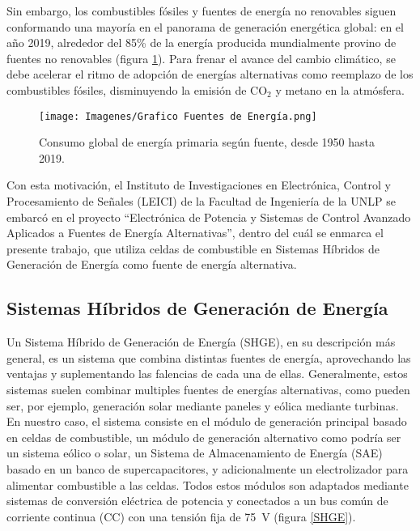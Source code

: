 Sin embargo, los combustibles fósiles y fuentes de energía no renovables siguen conformando una mayoría en el panorama de generación energética global: en el año 2019, alrededor del 85\% de la energía producida mundialmente provino de fuentes no renovables (figura \ref{Emisiones_CO2}).\textsuperscript{\cite{ProdEnergia}} Para frenar el avance del cambio climático, se debe acelerar el ritmo de adopción de energías alternativas como reemplazo de los combustibles fósiles, disminuyendo la emisión de CO$_2$ y metano en la atmósfera.\\

\begin{figure}[h]
    \centering
    \texttt{[image: Imagenes/Grafico Fuentes de Energía.png]}
    \caption{Consumo global de energía primaria según fuente, desde 1950 hasta 2019.}
    \label{Emisiones_CO2}
\end{figure}

Con esta motivación, el Instituto de Investigaciones en Electrónica, Control y Procesamiento de Señales (LEICI) de la Facultad de Ingeniería de la UNLP se embarcó en el proyecto ``Electrónica de Potencia y Sistemas de Control Avanzado Aplicados a Fuentes de Energía Alternativas'', dentro del cuál se enmarca el presente trabajo, que utiliza celdas de combustible en Sistemas Híbridos de Generación de Energía como fuente de energía alternativa.\\

\subsection{Sistemas Híbridos de Generación de Energía}

Un Sistema Híbrido de Generación de Energía (SHGE), en su descripción más general, es un sistema que combina distintas fuentes de energía, aprovechando las ventajas y suplementando las falencias de cada una de ellas. Generalmente, estos sistemas suelen combinar multiples fuentes de energías alternativas, como pueden ser, por ejemplo, generación solar mediante paneles y eólica mediante turbinas.\textsuperscript{\cite{HybridEnergySystems}}\\

En nuestro caso, el sistema consiste en el módulo de generación principal basado en celdas de combustible, un módulo de generación alternativo como podría ser un sistema eólico o solar, un Sistema de Almacenamiento de Energía (SAE) basado en un banco de supercapacitores, y adicionalmente  un electrolizador para alimentar combustible a las celdas. Todos estos módulos son adaptados mediante sistemas de conversión eléctrica de potencia y conectados a un bus común de corriente continua (CC) con una tensión fija de \SI{75}{\volt} (figura \ref{SHGE}).\textsuperscript{\cite{Talpone2012}\cite{FIAnderson2019}}\\

